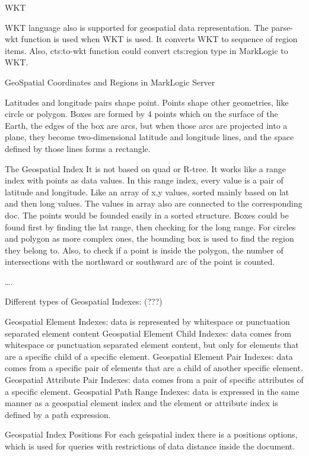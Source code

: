  WKT

	WKT language also is supported for geospatial data representation. The parse-wkt function is used when WKT is used. It converts WKT to sequence of region items. Also, cts:to-wkt function could convert cts:region type in MarkLogic to WKT.

GeoSpatial Coordinates and Regions in MarkLogic Server


Latitudes and longitude pairs shape point. Points shape other geometries, like circle or polygon. Boxes are formed by 4 points which on the surface of the Earth, the edges of the box are arcs, but when those arcs are projected into a plane, they become two-dimensional latitude and longitude lines, and the space defined by those lines forms a rectangle.


The Geospatial Index
It is not based on quad or R-tree. It works like a range index with points as data values. In this range index, every value is a pair of latitude and longitude. Like an array of x,y values, sorted mainly based on lat and then long values. The values in array also are connected to the corresponding doc.
The points would be founded easily in a sorted structure. Boxes could be found first by finding the lat range, then checking for the long range. For circles and polygon as more complex ones, the bounding box is used to find the region they belong to. Also, to check if a point is inside the polygon, the number of intersections with the northward or southward arc of the point is counted. 

…. 

Different types of Geospatial Indexes: (???)

 Geospatial Element Indexes: data is represented by whitespace or punctuation separated element content 
 Geospatial Element Child Indexes: data comes from whitespace or punctuation separated element content, but only for elements that are a specific child of a specific element.
 Geospatial Element Pair Indexes: data comes from a specific pair of elements that are a child of another specific element.
 Geospatial Attribute Pair Indexes: data comes from a pair of specific attributes of a specific element.
 Geospatial Path Range Indexes: data is expressed in the same manner as a geospatial element index and the element or attribute index is defined by a path expression.


Geospatial Index Positions
	For each geispatial index there is a positions options, which is used for queries with restrictions 	of data distance inside the document.

